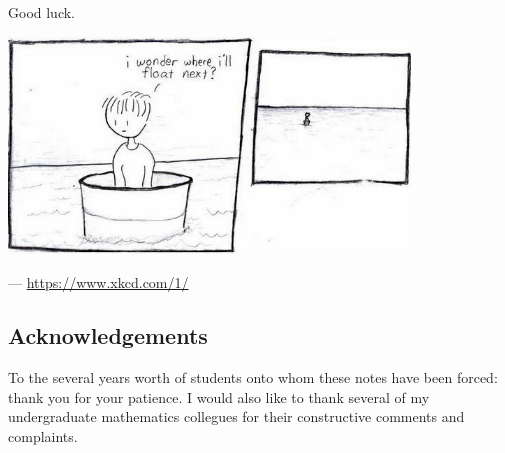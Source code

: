 Good luck.

\begin{center}
  \includegraphics[width=0.8\textwidth]{barrel}
\end{center}
\begin{flushright}--- \url{https://www.xkcd.com/1/}\end{flushright}

\subsection*{Acknowledgements}
To the several years worth of students onto whom these notes have been forced: thank you for your patience. I would also
like to thank several of my undergraduate mathematics collegues for their constructive comments and complaints.



